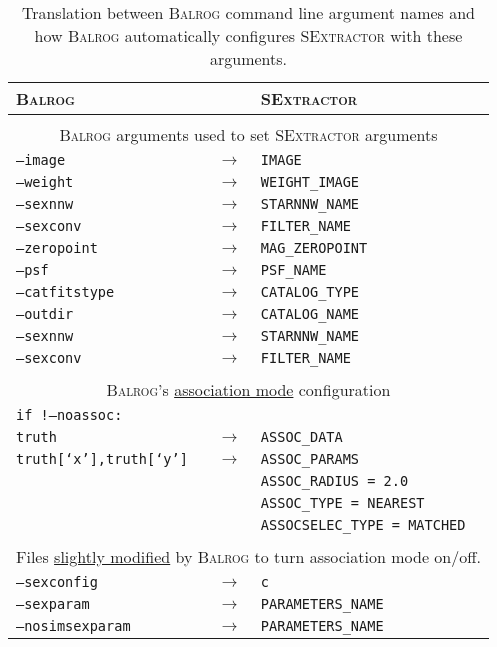 \documentclass[11pt]{book}
\newcommand{\codett}[1]{\texttt{#1}}
\newcommand{\balrog}{\textsc{Balrog}}
\newcommand{\sex}{\textsc{SExtractor}}
\newcommand{\opt}[1]{\codett{--#1}}
\begin{document}
\begin{table}[h]
\caption{Translation between \balrog{} command line argument names and how \balrog{} automatically configures
\sex{} with these arguments.} \label{tab:b2s}
\begin{tabular}{l l l} \toprule %

\rowcolor{gray2} \textbf{\balrog{}} & & \textbf{\sex{}} \\ \midrule 
\rowcolor{white} & & \\
\multicolumn{3}{c}{\balrog{} arguments used to set \sex{} arguments} \\
\opt{image} & $\rightarrow$ & \codett{IMAGE} \\
\opt{weight} &  $\rightarrow$ & \codett{WEIGHT\_IMAGE}\\
\opt{sexnnw} & $\rightarrow$ & \codett{STARNNW\_NAME} \\
\opt{sexconv} & $\rightarrow$ & \codett{FILTER\_NAME} \\
\opt{zeropoint} & $\rightarrow$ & \codett{MAG\_ZEROPOINT} \\
\opt{psf} & $\rightarrow$ & \codett{PSF\_NAME} \\
\opt{catfitstype} & $\rightarrow$ & \codett{CATALOG\_TYPE} \\
\opt{outdir} & $\rightarrow$ & \codett{CATALOG\_NAME} \\ 
\opt{sexnnw} & $\rightarrow$ & \codett{STARNNW\_NAME} \\ 
\opt{sexconv} & $\rightarrow$ & \codett{FILTER\_NAME} \\ 

\rowcolor{white} & & \\
\multicolumn{3}{c}{\balrog{}'s \hyperlink{hyper:assoc}{association mode} configuration} \\
\rowcolor{gray1} \codett{if !--noassoc:} & & \\
\rowcolor{gray1} \texttt{truth} & $\rightarrow$ & \codett{ASSOC\_DATA} \\
\rowcolor{gray1} \texttt{truth[`x'],truth[`y']} & $\rightarrow$ & \codett{ASSOC\_PARAMS} \\
\rowcolor{gray1} & & \codett{ASSOC\_RADIUS = 2.0} \\
\rowcolor{gray1} & & \codett{ASSOC\_TYPE = NEAREST} \\
\rowcolor{gray1} & & \codett{ASSOCSELEC\_TYPE = MATCHED} \\
\rowcolor{white} & & \\
\multicolumn{3}{c}{Files \hyperlink{hyper:sexfiles}{slightly modified} by \balrog{} to turn association mode on/off.} \\
\opt{sexconfig} & $\rightarrow$  &\codett{c} \\
\opt{sexparam} & $\rightarrow$  &\codett{PARAMETERS\_NAME} \\ 
\opt{nosimsexparam} & $\rightarrow$  &\codett{PARAMETERS\_NAME} \\ \bottomrule


\end{tabular}
\end{table}
\end{document}
